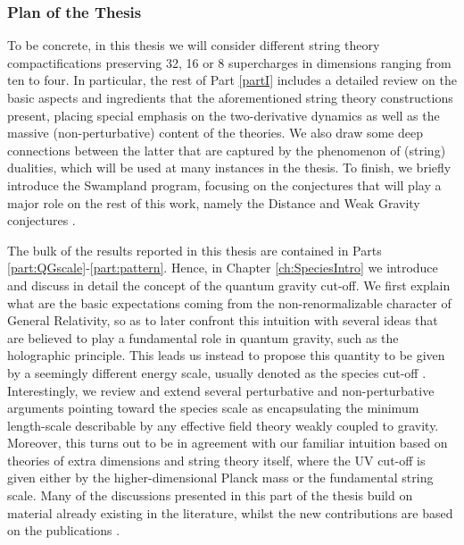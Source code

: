 \subsubsection*{Plan of the Thesis}

To be concrete, in this thesis we will consider different string theory compactifications preserving 32, 16 or 8 supercharges in dimensions ranging from ten to four. In particular, the rest of Part \ref{partI} includes a detailed review on the basic aspects and ingredients that the aforementioned string theory constructions present, placing special emphasis on the two-derivative dynamics as well as the massive (non-perturbative) content of the theories. We also draw some deep connections between the latter that are captured by the phenomenon of (string) dualities, which will be used at many instances in the thesis. To finish, we briefly introduce the Swampland program, focusing on the conjectures that will play a major role on the rest of this work, namely the Distance  \cite{Ooguri:2006in} and Weak Gravity conjectures \cite{Heidenreich:2015nta, Heidenreich:2016aqi, Montero:2016tif, Andriolo:2018lvp}. 

The bulk of the results reported in this thesis are contained in Parts \ref{part:QGscale}-\ref{part:pattern}. Hence, in Chapter \ref{ch:SpeciesIntro} we introduce and discuss in detail the concept of the quantum gravity cut-off. We first explain what are the basic expectations coming from the non-renormalizable character of General Relativity, so as to later confront this intuition with several ideas that are believed to play a fundamental role in quantum gravity, such as the holographic principle. This leads us instead to propose this quantity to be given by a seemingly different energy scale, usually denoted as the species cut-off \cite{Han:2004wt, Dvali:2007hz, Dvali:2007wp}. Interestingly, we review and extend several perturbative and non-perturbative arguments pointing toward the species scale as encapsulating the minimum length-scale describable by any effective field theory weakly coupled to gravity. Moreover, this turns out to be in agreement with our familiar intuition based on theories of extra dimensions and string theory itself, where the UV cut-off is given either by the higher-dimensional Planck mass or the fundamental string scale. Many of the discussions presented in this part of the thesis build on material already existing in the literature, whilst the new contributions are based on the publications \cite{Castellano:2022bvr,Castellano:2023aum}.

